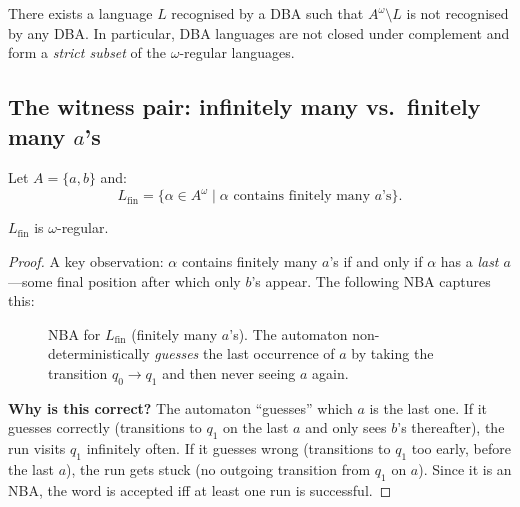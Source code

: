 \begin{theorem}
\label{thm:dba-not-complement}
There exists a language $L$ recognised by a DBA such that
$A^\omega \setminus L$ is not recognised by any DBA.  In particular, DBA
languages are not closed under complement and form a \emph{strict subset}
of the $\omega$-regular languages.
\end{theorem}

\subsection{The witness pair: infinitely many vs.\ finitely many \texorpdfstring{$a$}{a}'s}

\begin{definition}
\label{def:Lfin}
Let $A = \{a, b\}$ and:
\[
  L_{\mathrm{fin}} = \{\alpha \in A^\omega \mid
    \alpha \text{ contains finitely many } a\text{'s}\}.
\]
\end{definition}

\begin{proposition}
$L_{\mathrm{fin}}$ is $\omega$-regular.
\end{proposition}
\begin{proof}
A key observation: $\alpha$ contains finitely many $a$'s if and only if
$\alpha$ has a \emph{last $a$}---some final position after which only
$b$'s appear.  The following NBA captures this:

\begin{figure}[ht]
  \centering
  \caption{NBA for $L_{\mathrm{fin}}$ (finitely many $a$'s).  The
           automaton non-deterministically \emph{guesses} the last
           occurrence of $a$ by taking the transition $q_0 \to q_1$
           and then never seeing $a$ again.}
  \label{fig:nba-lfin}
\end{figure}

\textbf{Why is this correct?}  The automaton ``guesses'' which $a$ is the
last one.  If it guesses correctly (transitions to $q_1$ on the last $a$
and only sees $b$'s thereafter), the run visits $q_1$ infinitely often.
If it guesses wrong (transitions to $q_1$ too early, before the last $a$),
the run gets stuck (no outgoing transition from $q_1$ on $a$).  Since
it is an NBA, the word is accepted iff at least one run is successful.
\end{proof}

